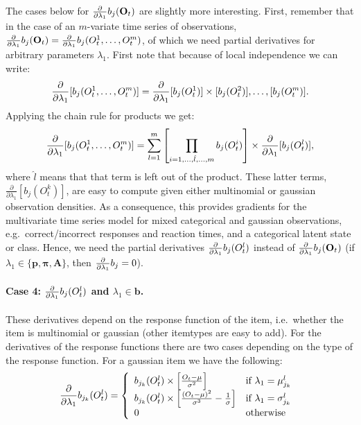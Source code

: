 \documentclass[a4paper,12pt,doc]{apaIngmar} %
\newcommand{\mat}{\mathbf}
\newcommand{\vc}{\mathbf}
\begin{document}
The cases below for $\fpp b_{j}(\vc{O}_{t})$ are slightly more
interesting.  First, remember that in the case of an $m$-variate time
series of observations, $\fpp b_{j}(\vc{O}_{t})=\fpp b_{j}(O_{t}^{1},
\ldots, O_{t}^{m})$, of which we need partial derivatives for
arbitrary parameters $\lambda_{1}$.  First note that because of local
independence we can write:
\begin{equation}
	\frac{\partial} {\partial \lambda_{1}} [b_{j}(O_{t}^{1}, \ldots, O_{t}^{m})]= \frac{\partial} 
{\partial \lambda_{1} } [b_{j}(O_{t}^{1})] \times  
[b_{j}(O_{t}^{2})], \ldots,  [b_{j}(O_{t}^{m})].  
\end{equation}
Applying the chain rule for products we get:
\begin{equation}
	\frac{\partial} {\partial \lambda_{1}} [b_{j}(O_{t}^{1}, \ldots, O_{t}^{m})] =
	\sum_{l=1}^{m} \left[ \prod_{i=1, \ldots, \hat{l}, \ldots, m} 
b_{j}(O_{t}^{i}) \right] \times
	\frac{\partial} {\partial \lambda_{1}}  [b_{j}(O_{t}^{l})],
	\label{partialProd}
\end{equation}
where $\hat{l}$ means that that term is left out of the product.
These latter terms, $\frac{\partial} {\partial \lambda_{1} }
[b_{j}(O_{t}^{k})]$, are easy to compute given either multinomial or
gaussian observation densities.  As a consequence, this provides
gradients for the multivariate time series model for mixed categorical
and gaussian observations, e.g.\ correct/incorrect responses and
reaction times, and a categorical latent state or class.  Hence, we
need the partial derivatives $\frac{\partial} {\partial \lambda_{1}} b_{j}({O}_{t}^{l})$ instead of
$\fpp b_{j}(\vc{O}_{t})$ (if $\lambda_{1} \in \{ \vc{p},
\pmb{\pi},\mat{A} \} $, then $\frac{\partial} {\partial \lambda_{1}} b_{j}=0$).


\paragraph{Case 4: $\frac{\partial} {\partial \lambda_{1}} b_{j}({O}_{t}^{l})$ and $\lambda_{1} \in
\vc{b}$.} These derivatives depend on the response function of the
item, i.e.\ whether the item is multinomial or gaussian (other
itemtypes are easy to add).  For the derivatives of the response
functions there are two cases depending on the type of the response
function.  For a gaussian item we have the following:
\begin{align} 
	\frac{\partial} {\partial \lambda_{1}} b_{j_{k}}(O_{t}^{l})= \left\{
	\begin{array}{ll} 
		b_{j_{k}}(O_{t}^{l}) \times \left[
		\frac{O_{t}-\mu}{\sigma^{2}} \right] & \mbox{if $\lambda_{1} =
		\mu_{j_{k}}^{l} $ } 
		\\
		b_{j_{k}}(O_{t}^{l}) \times \left[
		\frac{(O_{t}-\mu)^{2}}{\sigma^{3}} - \frac{1}{\sigma} \right]
		& \mbox{if $\lambda_{1} = \sigma_{j_{k}}^{l} $} 
		\\
		0 & \mbox{otherwise} \end{array} \right.
\end{align}
		
\end{document}
